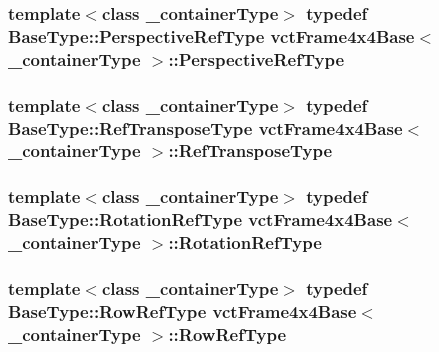 \hypertarget{classvct_frame4x4_base_a445582cef7ba9f03553b1d9e63a2d64c}{
\subsubsection[{Perspective\-Ref\-Type}]{\setlength{\rightskip}{0pt plus 5cm}template$<$class \-\_\-container\-Type$>$ typedef Base\-Type\-::\-Perspective\-Ref\-Type {\bf vct\-Frame4x4\-Base}$<$ \-\_\-container\-Type $>$\-::{\bf Perspective\-Ref\-Type}}}\label{classvct_frame4x4_base_a445582cef7ba9f03553b1d9e63a2d64c}
\hypertarget{classvct_frame4x4_base_aee8d584095f21f29903fe8a8b62fb9c6}{
\subsubsection[{Ref\-Transpose\-Type}]{\setlength{\rightskip}{0pt plus 5cm}template$<$class \-\_\-container\-Type$>$ typedef {\bf Base\-Type\-::\-Ref\-Transpose\-Type} {\bf vct\-Frame4x4\-Base}$<$ \-\_\-container\-Type $>$\-::{\bf Ref\-Transpose\-Type}}}\label{classvct_frame4x4_base_aee8d584095f21f29903fe8a8b62fb9c6}
\hypertarget{classvct_frame4x4_base_a57cec1ba52b9787d77da60fb020c1999}{
\subsubsection[{Rotation\-Ref\-Type}]{\setlength{\rightskip}{0pt plus 5cm}template$<$class \-\_\-container\-Type$>$ typedef Base\-Type\-::\-Rotation\-Ref\-Type {\bf vct\-Frame4x4\-Base}$<$ \-\_\-container\-Type $>$\-::{\bf Rotation\-Ref\-Type}}}\label{classvct_frame4x4_base_a57cec1ba52b9787d77da60fb020c1999}
\hypertarget{classvct_frame4x4_base_a25703f0acac48328ee260245ddf4b2af}{
\subsubsection[{Row\-Ref\-Type}]{\setlength{\rightskip}{0pt plus 5cm}template$<$class \-\_\-container\-Type$>$ typedef {\bf Base\-Type\-::\-Row\-Ref\-Type} {\bf vct\-Frame4x4\-Base}$<$ \-\_\-container\-Type $>$\-::{\bf Row\-Ref\-Type}}}\label{classvct_frame4x4_base_a25703f0acac48328ee260245ddf4b2af}

